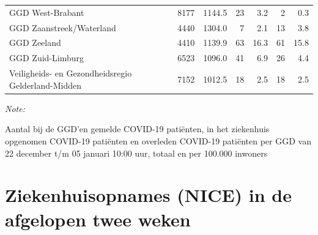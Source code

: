 \documentclass[
  english,
  man,floatsintext]{apa6}
\begin{document}
\begin{table}
\begin{threeparttable}
\begin{tabular}{lrrrrrr}
GGD West-Brabant & 8177 & 1144.5 & 23 & 3.2 & 2 & 0.3\\
GGD Zaanstreek/Waterland & 4440 & 1304.0 & 7 & 2.1 & 13 & 3.8\\
GGD Zeeland & 4410 & 1139.9 & 63 & 16.3 & 61 & 15.8\\
GGD Zuid-Limburg & 6523 & 1096.0 & 41 & 6.9 & 26 & 4.4\\
Veiligheids- en Gezondheidsregio Gelderland-Midden & 7152 & 1012.5 & 18 & 2.5 & 18 & 2.5\\
\bottomrule
\end{tabular}
\begin{tablenotes}
\item \textit{Note: } 
\item Aantal bij de GGD’en gemelde COVID-19 patiënten, in het ziekenhuis opgenomen COVID-19 patiënten en overleden COVID-19 patiënten per GGD van 22 december t/m 05 januari 10:00 uur, totaal en per 100.000 inwoners
\end{tablenotes}
\end{threeparttable}
\endgroup{}
\end{table}

\newpage

\hypertarget{ziekenhuisopnames-nice-in-de-afgelopen-twee-weken}{%
\section{Ziekenhuisopnames (NICE) in de afgelopen twee weken}\label{ziekenhuisopnames-nice-in-de-afgelopen-twee-weken}}
\end{document}
